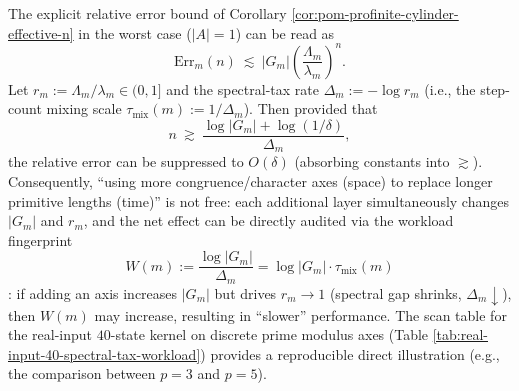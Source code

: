 \begin{remark}\label{rem:pom-spectral-tax-workload}
The explicit relative error bound of Corollary \ref{cor:pom-profinite-cylinder-effective-n} in the worst case (\(|A|=1\)) can be read as
\[
\mathrm{Err}_m(n)\ \lesssim\ |G_m|\left(\frac{\Lambda_m}{\lambda_m}\right)^n.
\]
Let
\(
r_m:=\Lambda_m/\lambda_m\in(0,1]
\)
and the spectral-tax rate
\(
\Delta_m:=-\log r_m
\)
(i.e., the step-count mixing scale \(\tau_{\mathrm{mix}}(m):=1/\Delta_m\)).
Then provided that
\[
n\ \gtrsim\ \frac{\log|G_m|+\log(1/\delta)}{\Delta_m},
\]
the relative error can be suppressed to \(O(\delta)\) (absorbing constants into \(\gtrsim\)).
Consequently, ``using more congruence/character axes (space) to replace longer primitive lengths (time)'' is not free: each additional layer simultaneously changes
\(|G_m|\) and \(r_m\), and the net effect can be directly audited via the workload fingerprint
\[
W(m):=\frac{\log|G_m|}{\Delta_m}=\log|G_m|\cdot\tau_{\mathrm{mix}}(m)
\]
: if adding an axis increases \(|G_m|\) but drives \(r_m\to 1\) (spectral gap shrinks, \(\Delta_m\downarrow\)), then \(W(m)\) may increase, resulting in ``slower'' performance.
The scan table for the real-input \(40\)-state kernel on discrete prime modulus axes (Table \ref{tab:real-input-40-spectral-tax-workload}) provides a reproducible direct illustration (e.g., the comparison between \(p=3\) and \(p=5\)).
\end{remark}




